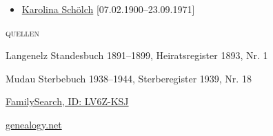 \begin{person}[
    surname = {Schölch},
    givenname = {Johann Josef},
    suffix = {1865--1939},
    label = {@I156@},
    filename = {Johann Schölch (1865)}
    ]
\begin{itemize}
\item \hyperref[@I430@]{Karolina Schölch} [07.02.1900--23.09.1971]
\end{itemize}
\medbreak
\textsc{{quellen}}
\begin{enumerate}[label={[\arabic*]}]
\item Langenelz Standesbuch 1891–1899, Heiratsregister 1893, Nr. 1
\item Mudau Sterbebuch 1938–1944, Sterberegister 1939, Nr. 18
\item \href{https://www.familysearch.org/tree/person/details/LV6Z-KSJ}{FamilySearch, ID: LV6Z-KSJ}
\item \href{http://gedbas.genealogy.net/person/show/1172960807}{genealogy.net}
\end{enumerate}

\end{person}

